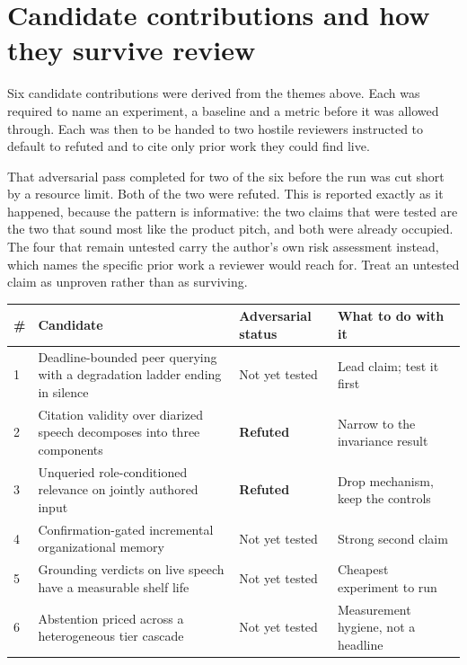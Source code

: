 \section{Candidate contributions and how they survive review}

Six candidate contributions were derived from the themes above. Each was
required to name an experiment, a baseline and a metric before it was allowed
through. Each was then to be handed to two hostile reviewers instructed to
default to refuted and to cite only prior work they could find live.

That adversarial pass completed for two of the six before the run was cut
short by a resource limit. Both of the two were refuted. This is reported
exactly as it happened, because the pattern is informative: the two claims that
were tested are the two that sound most like the product pitch, and both were
already occupied. The four that remain untested carry the author's own risk
assessment instead, which names the specific prior work a reviewer would reach
for. Treat an untested claim as unproven rather than as surviving.

\begin{center}
{\footnotesize
\begin{tabular}{@{}p{0.4cm}p{6.6cm}p{3.0cm}p{5.2cm}@{}}
\toprule
\textbf{\#} & \textbf{Candidate} & \textbf{Adversarial status} & \textbf{What to do with it} \\
\midrule
1 & Deadline-bounded peer querying with a degradation ladder ending in silence & Not yet tested & Lead claim; test it first \\
2 & Citation validity over diarized speech decomposes into three components & \textbf{Refuted} & Narrow to the invariance result \\
3 & Unqueried role-conditioned relevance on jointly authored input & \textbf{Refuted} & Drop mechanism, keep the controls \\
4 & Confirmation-gated incremental organizational memory & Not yet tested & Strong second claim \\
5 & Grounding verdicts on live speech have a measurable shelf life & Not yet tested & Cheapest experiment to run \\
6 & Abstention priced across a heterogeneous tier cascade & Not yet tested & Measurement hygiene, not a headline \\
\bottomrule
\end{tabular}}
\end{center}

